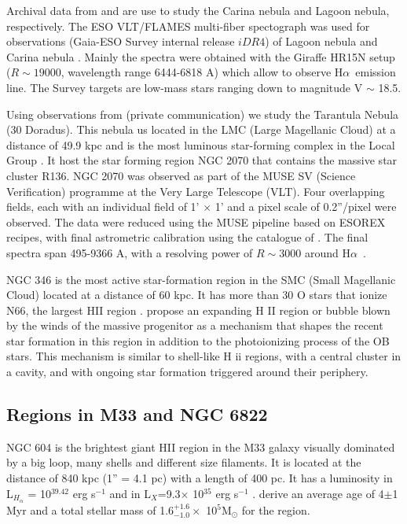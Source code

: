 \documentclass[fleqn,usenatbib, useAMS, a4paper]{mnras}
\newcommand\halpha{H${\alpha}$}
\begin{document}
Archival data from \citet{Damiani:2016a} and \citet{Damiani:2017b} are use to study the Carina nebula and Lagoon nebula, respectively. 
The ESO VLT/FLAMES multi-fiber spectograph was used for observations (Gaia-ESO Survey internal release \(iDR4\)) of Lagoon nebula  and Carina nebula \citep{2002Msngr.110....1P}. 
Mainly the spectra were obtained with the Giraffe HR15N setup (\(R \sim19 000\), wavelength range 6444-6818 A) which allow to observe \halpha\ emission line. 
The Survey targets are low-mass stars ranging down to magnitude V \(\sim\) 18.5.

Using observations from \citet{Castro:2018a} (private communication) we study the Tarantula Nebula (30 Doradus).
This nebula us located in the LMC (Large Magellanic Cloud) at a distance of 49.9 kpc \citep{2013Natur.495...76P} and is the most luminous star-forming complex in the Local Group \citep{1984ApJ...287..116K}.
It host the star forming region NGC 2070 that contains the massive star cluster R136.
NGC 2070 was observed as part of the MUSE SV (Science Verification) programme at the Very Large Telescope (VLT). 
Four overlapping fields, each with an individual field of 1' \(\times\) 1' and a pixel scale of 0.2''/pixel were observed. 
The data were reduced using the MUSE pipeline based on ESOREX recipes, with final astrometric calibration using the catalogue of \citet{1999A&A...341...98S}. 
The final spectra span 495-9366 A, with a resolving power of \(R \sim3 000\) around \halpha\  \citep{Castro:2018a}.

NGC 346 is the most active star-formation region in the SMC (Small Magellanic Cloud) located at a distance of 60 kpc. 
It has more than 30 O stars that ionize N66, the largest HII region \citep{2011ApJ...740...10D}.
\citet{2008ApJ...688.1050G} propose an expanding H II region or bubble blown by the winds of the massive progenitor as a mechanism that shapes the recent star formation in this region in addition to the photoionizing process of the OB stars. 
This mechanism is similar to shell-like H ii regions, with a central cluster in a cavity, and with ongoing star formation triggered around their periphery.

\subsection{Regions in M33 and NGC 6822} 

NGC 604 is the brightest giant HII region in the M33 galaxy visually dominated by a big loop, many shells and different size filaments.
It is located at the distance of 840 kpc (1'' = 4.1 pc) \citep{2015KamKinematics} with a length of 400 pc.
It has a luminosity in L$_{H_\alpha}$ = 10$^{39.42}$ erg s$^{-1}$ \citep{2002MNRAS.329..481B} and in L$_{X}$=9.3$\times$ 10$^{35}$ erg s$^{-1}$ \citep{2008ApJ...685..919T}.
\citet{2012ApJ...761....3M} derive an average age of 4$\pm$1 Myr and a total stellar mass of 1.6$^{+1.6}_{-1.0} \times$ 10$^{5}$M$_{\odot}$ for the region.
\end{document}
